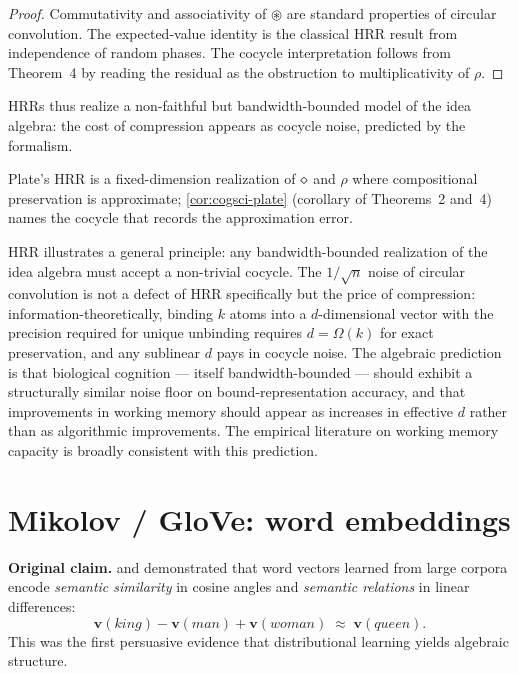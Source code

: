 \begin{proof}
Commutativity and associativity of $\circledast$ are standard
properties of circular convolution. The expected-value identity is the
classical HRR result \citep{Plate1995} from independence of random
phases. The cocycle interpretation follows from Theorem~4 by reading
the residual as the obstruction to multiplicativity of $\rho$. \qedhere
\end{proof}

HRRs thus realize a non-faithful but bandwidth-bounded model of the idea
algebra: the cost of compression appears as cocycle noise, predicted by
the formalism.

\formalstatus Plate's HRR is a fixed-dimension realization of $\mathbin{\diamond}$
and $\rho$ where compositional preservation is approximate;
\cref{cor:cogsci-plate} (corollary of Theorems~2 and~4) names the cocycle
that records the approximation error.

\litcomment HRR illustrates a general principle: any bandwidth-bounded
realization of the idea algebra must accept a non-trivial cocycle. The
$1/\sqrt{n}$ noise of circular convolution is not a defect of HRR
specifically but the price of compression: information-theoretically,
binding $k$ atoms into a $d$-dimensional vector with the precision
required for unique unbinding requires $d=\Omega(k)$ for exact
preservation, and any sublinear $d$ pays in cocycle noise. The
algebraic prediction is that biological cognition --- itself
bandwidth-bounded --- should exhibit a structurally similar noise
floor on bound-representation accuracy, and that improvements in
working memory should appear as increases in effective $d$ rather than
as algorithmic improvements. The empirical literature on working
memory capacity is broadly consistent with this prediction.

\section{Mikolov / GloVe: word embeddings}\label{sec:cogsci-mikolov}

\textbf{Original claim.} \citet{Mikolov2013} and
\citet{PenningtonGloVe2014} demonstrated that word vectors learned from
large corpora encode \emph{semantic similarity} in cosine angles and
\emph{semantic relations} in linear differences:
\[
  \mathbf{v}(\mathit{king})-\mathbf{v}(\mathit{man})+
  \mathbf{v}(\mathit{woman})\;\approx\;\mathbf{v}(\mathit{queen}).
\]
This was the first persuasive evidence that distributional learning yields
algebraic structure.

